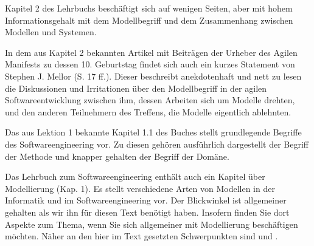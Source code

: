 {Kapitel 2 des Lehrbuchs beschäftigt sich auf wenigen Seiten, aber mit hohem Informationsgehalt mit dem Modellbegriff und dem Zusammenhang zwischen Modellen und Systemen.}

{In dem aus Kapitel 2 bekannten  Artikel mit Beiträgen der Urheber des Agilen Manifests zu dessen 10. Geburtstag findet sich auch ein kurzes Statement von Stephen J. Mellor (S. 17 ff.). Dieser beschreibt anekdotenhaft und nett zu lesen die Diskussionen und Irritationen über den Modellbegriff in der agilen Softwareentwicklung zwischen ihm, dessen Arbeiten sich um Modelle drehten, und den anderen Teilnehmern des Treffens, die Modelle eigentlich ablehnten.}

{Das aus Lektion 1 bekannte Kapitel 1.1 des Buches stellt grundlegende Begriffe des Softwareengineering vor. Zu diesen gehören ausführlich dargestellt der Begriff der Methode und knapper gehalten der Begriff der Domäne.}

\clearpage %

{Das Lehrbuch zum Softwareengineering enthält auch ein Kapitel über Modellierung (Kap. 1). Es stellt verschiedene Arten von Modellen in der Informatik und im Softwareengineering vor. Der Blickwinkel ist allgemeiner gehalten als wir ihn für diesen Text benötigt haben. Insofern finden Sie dort Aspekte zum Thema, wenn Sie sich allgemeiner mit Modellierung beschäftigen möchten. Näher an den hier im Text gesetzten Schwerpunkten sind \cite{som18} und \cite{sch10}.}